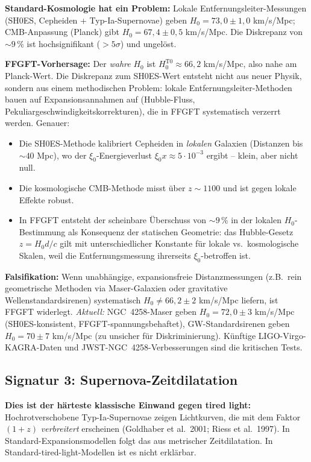 \textbf{Standard-Kosmologie hat ein Problem:} Lokale
Entfernungsleiter-Messungen (SH0ES, Cepheiden + Typ-Ia-Supernovae)
geben $H_0 = 73{,}0 \pm 1{,}0$ km/s/Mpc; CMB-Anpassung (Planck) gibt
$H_0 = 67{,}4 \pm 0{,}5$ km/s/Mpc. Die Diskrepanz von $\sim 9\,\%$
ist hochsignifikant ($> 5\sigma$) und ungelöst.

\textbf{FFGFT-Vorhersage:} Der \emph{wahre} $H_0$ ist
$H_0^{\text{T0}} \approx 66{,}2$ km/s/Mpc, also nahe am
Planck-Wert. Die Diskrepanz zum SH0ES-Wert entsteht nicht aus neuer
Physik, sondern aus einem methodischen Problem: lokale
Entfernungsleiter-Methoden bauen auf Expansionsannahmen auf (Hubble-Fluss,
Pekuliargeschwindigkeitskorrekturen), die in FFGFT systematisch
verzerrt werden. Genauer:
\begin{itemize}[leftmargin=2em,itemsep=2pt,topsep=2pt]
  \item Die SH0ES-Methode kalibriert Cepheiden in \emph{lokalen}
        Galaxien (Distanzen bis $\sim 40$ Mpc), wo der
        $\xi_0$-Energieverlust $\xi_0 x \approx 5\!\cdot\!10^{-3}$
        ergibt -- klein, aber nicht null.
  \item Die kosmologische CMB-Methode misst über $z \sim 1100$ und
        ist gegen lokale Effekte robust.
  \item In FFGFT entsteht der scheinbare Überschuss von $\sim 9\,\%$
        in der lokalen $H_0$-Bestimmung als Konsequenz der
        statischen Geometrie: das Hubble-Gesetz $z = H_0 d/c$ gilt
        mit unterschiedlicher Konstante für lokale vs.\ kosmologische
        Skalen, weil die Entfernungsmessung ihrerseits $\xi_0$-betroffen ist.
\end{itemize}

\textbf{Falsifikation:} Wenn unabhängige, expansionsfreie
Distanzmessungen (z.B.\ rein geometrische Methoden via Maser-Galaxien
oder gravitative Wellenstandardsirenen) systematisch
$H_0 \neq 66{,}2 \pm 2$ km/s/Mpc liefern, ist FFGFT widerlegt.
\emph{Aktuell:} NGC~4258-Maser geben $H_0 = 72{,}0 \pm 3$ km/s/Mpc
(SH0ES-konsistent, FFGFT-spannungsbehaftet), GW-Standardsirenen
geben $H_0 = 70 \pm 7$ km/s/Mpc (zu unsicher für Diskriminierung).
Künftige LIGO-Virgo-KAGRA-Daten und JWST-NGC~4258-Verbesserungen
sind die kritischen Tests.

\subsection{Signatur 3: Supernova-Zeitdilatation}

\textbf{Dies ist der härteste klassische Einwand gegen tired light:}
Hochrotverschobene Typ-Ia-Supernovae zeigen Lichtkurven, die mit dem
Faktor $(1+z)$ \emph{verbreitert} erscheinen (Goldhaber et al.\ 2001;
Riess et al.\ 1997). In Standard-Expansionsmodellen folgt das aus
metrischer Zeitdilatation. In Standard-tired-light-Modellen ist es
nicht erklärbar.

